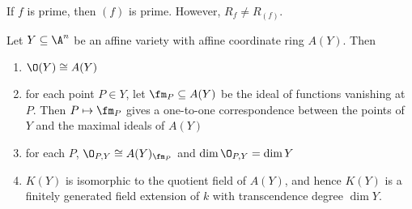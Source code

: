 \begin{rem}
If $f$ is prime, then $(f)$ is prime. However, $R_f \neq R_{(f)}$. 
\end{rem}


\begin{thm}
Let $Y \subseteq \A^n$ be an affine variety with affine coordinate ring $A(Y)$. Then
\begin{enumerate}
\item $\O(Y) \cong A(Y)$
\item for each point $P \in Y$, let $\fm_P \subseteq A(Y)$ be the ideal of functions vanishing at $P$. Then $P \mapsto \fm_P$ gives a one-to-one correspondence between the points of $Y$ and the maximal ideals of $A(Y)$
\item for each $P$, $\O_{P,Y} \cong A(Y)_{\fm_P}$ and $\dim \O_{P,Y}= \dim Y$
\item $K(Y)$ is isomorphic to the quotient field of $A(Y)$, and hence $K(Y)$ is a finitely generated field extension of $k$ with transcendence degree $\dim Y$. 
\end{enumerate}
\end{thm}

